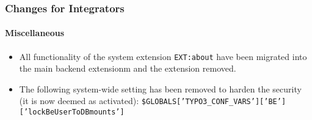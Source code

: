 %

\begin{frame}[fragile]
	\frametitle{Changes for Integrators}
	\framesubtitle{Miscellaneous}

	\begin{itemize}
		\item All functionality of the system extension \texttt{EXT:about}
			have been migrated into the main backend extensionm and the
			extension removed.
		\item The following system-wide setting has been removed to harden the security
			(it is now deemed as activated):\newline
			\small\texttt{\$GLOBALS['TYPO3\_CONF\_VARS']['BE']['lockBeUserToDBmounts']}\normalsize
	\end{itemize}

\end{frame}

